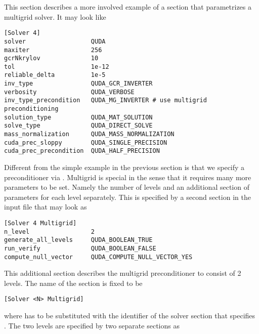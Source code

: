 This section describes a more involved example of a section that parametrizes a multigrid solver.
It may look like
\begin{verbatim}
[Solver 4]
solver                  QUDA
maxiter                 256
gcrNkrylov              10
tol                     1e-12
reliable_delta          1e-5
inv_type                QUDA_GCR_INVERTER
verbosity               QUDA_VERBOSE
inv_type_precondition   QUDA_MG_INVERTER # use multigrid preconditioning
solution_type           QUDA_MAT_SOLUTION
solve_type              QUDA_DIRECT_SOLVE
mass_normalization      QUDA_MASS_NORMALIZATION
cuda_prec_sloppy        QUDA_SINGLE_PRECISION
cuda_prec_precondition  QUDA_HALF_PRECISION
\end{verbatim}
Different from the simple example in the previous section is that we specify a preconditioner via .
Multigrid is special in the sense that it requires many more parameters to be set.
Namely the number of levels and an additional section of parameters for each level separately.
This is specified by a second section in the input file that may look as
\begin{verbatim}
[Solver 4 Multigrid]
n_level                 2
generate_all_levels     QUDA_BOOLEAN_TRUE
run_verify              QUDA_BOOLEAN_FALSE
compute_null_vector     QUDA_COMPUTE_NULL_VECTOR_YES
\end{verbatim}
This additional section describes the multigrid preconditioner to consist of 2 levels.
The name of the section is fixed to be
\begin{verbatim}
[Solver <N> Multigrid]
\end{verbatim}
where  has to be substituted with the identifier of the solver section that specifies .
The two levels are specified by two separate sections as
